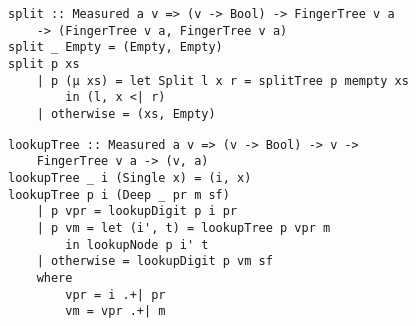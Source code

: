 \begin{frame}[fragile]
\begin{verbatim}
split :: Measured a v => (v -> Bool) -> FingerTree v a
    -> (FingerTree v a, FingerTree v a)
split _ Empty = (Empty, Empty)
split p xs
    | p (μ xs) = let Split l x r = splitTree p mempty xs
        in (l, x <| r)
    | otherwise = (xs, Empty)
\end{verbatim}
\end{frame}

\begin{frame}[fragile]
\begin{verbatim}
lookupTree :: Measured a v => (v -> Bool) -> v ->
    FingerTree v a -> (v, a)
lookupTree _ i (Single x) = (i, x)
lookupTree p i (Deep _ pr m sf)
    | p vpr = lookupDigit p i pr
    | p vm = let (i', t) = lookupTree p vpr m
        in lookupNode p i' t
    | otherwise = lookupDigit p vm sf
    where
        vpr = i .+| pr
        vm = vpr .+| m
\end{verbatim}
\end{frame}